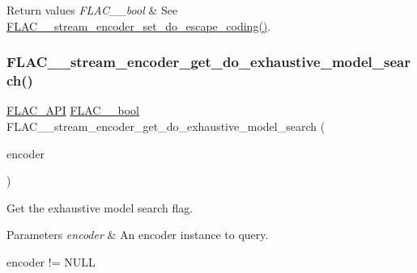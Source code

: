 \begin{DoxyRetVals}{Return values}
{\em F\+L\+A\+C\+\_\+\+\_\+bool} & See \hyperlink{group__flac__stream__encoder_gaa839d19b6d1b30ba0407d419bdb6fe67}{F\+L\+A\+C\+\_\+\+\_\+stream\+\_\+encoder\+\_\+set\+\_\+do\+\_\+escape\+\_\+coding()}. \\
\hline
\end{DoxyRetVals}
\mbox{\label{group__flac__stream__encoder_gad429e31c7062baff987571d935b889f4}} 
\subsubsection{\texorpdfstring{F\+L\+A\+C\+\_\+\+\_\+stream\+\_\+encoder\+\_\+get\+\_\+do\+\_\+exhaustive\+\_\+model\+\_\+search()}{FLAC\_\_stream\_encoder\_get\_do\_exhaustive\_model\_search()}}
{\footnotesize\ttfamily \hyperlink{group__flac__export_ga56ca07df8a23310707732b1c0007d6f5}{F\+L\+A\+C\+\_\+\+A\+PI} \hyperlink{ordinals_8h_a95103469f1cbd78b8cf250194985b34e}{F\+L\+A\+C\+\_\+\+\_\+bool} F\+L\+A\+C\+\_\+\+\_\+stream\+\_\+encoder\+\_\+get\+\_\+do\+\_\+exhaustive\+\_\+model\+\_\+search (\begin{DoxyParamCaption}\item[{\hyperlink{zconf_8h_a2c212835823e3c54a8ab6d95c652660e}{const} \hyperlink{struct_f_l_a_c_____stream_encoder}{F\+L\+A\+C\+\_\+\+\_\+\+Stream\+Encoder} $\ast$}]{encoder }\end{DoxyParamCaption})}

Get the exhaustive model search flag.


\begin{DoxyParams}{Parameters}
{\em encoder} & An encoder instance to query.  
\begin{DoxyCode}
encoder != NULL 
\end{DoxyCode}
 \\
\hline
\end{DoxyParams}


